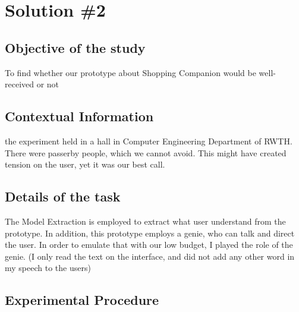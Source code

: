 \section{Solution \#2}

\subsection{Objective of the study}
To find whether our prototype about Shopping Companion would be well-received or not



\subsection{Contextual Information}
the experiment held in a hall in Computer Engineering Department of RWTH. There were passerby people, which we cannot avoid. This might have created tension on the user, yet it was our best call.


\subsection{Details of the task}
The Model Extraction is employed to extract what user understand from the prototype. In addition, this prototype employs a genie, who can talk and direct the user. In order to emulate that with our low budget, I played the role of the genie. (I only read the text on the interface, and did not add any other word in my speech to the users)

\subsection{Experimental Procedure}

